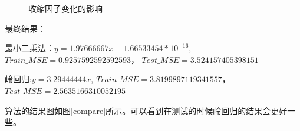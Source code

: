 \documentclass[final]{cvpr}
\begin{document}
\begin{figure}[htbp]
    \centering
\caption{收缩因子变化的影响}
\label{lambda}       
\end{figure}
最终结果：\par
最小二乘法：$y = 1.97666667x-1.66533454*10^{-16}$, $Train\_MSE = 0.9257592592592593$， $Test\_MSE = 3.524157405398151$\par
岭回归:$y = 3.29444444x$, $Train\_MSE = 3.8199897119341557$， $Test\_MSE = 2.5635166310052195 $ \par
算法的结果图如图\ref{compare}所示。可以看到在测试的时候岭回归的结果会更好一些。\par
\end{document}

